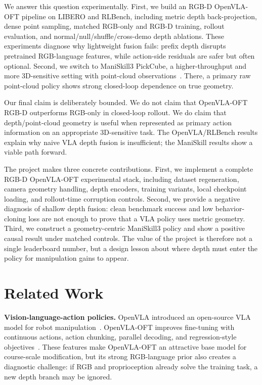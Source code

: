 \documentclass[conference]{IEEEtran}
\begin{document}
We answer this question experimentally. First, we build an RGB-D OpenVLA-OFT pipeline on LIBERO and RLBench, including metric depth back-projection, dense point sampling, matched RGB-only and RGB-D training, rollout evaluation, and normal/null/shuffle/cross-demo depth ablations. These experiments diagnose why lightweight fusion fails: prefix depth disrupts pretrained RGB-language features, while action-side residuals are safer but often optional. Second, we switch to ManiSkill3 PickCube, a higher-throughput and more 3D-sensitive setting with point-cloud observations~\citep{tao2024maniskill3}. There, a primary raw point-cloud policy shows strong closed-loop dependence on true geometry.

Our final claim is deliberately bounded. We do not claim that OpenVLA-OFT RGB-D outperforms RGB-only in closed-loop rollout. We do claim that depth/point-cloud geometry is useful when represented as primary action information on an appropriate 3D-sensitive task. The OpenVLA/RLBench results explain why naive VLA depth fusion is insufficient; the ManiSkill results show a viable path forward.

The project makes three concrete contributions. First, we implement a complete RGB-D OpenVLA-OFT experimental stack, including dataset regeneration, camera geometry handling, depth encoders, training variants, local checkpoint loading, and rollout-time corruption controls. Second, we provide a negative diagnosis of shallow depth fusion: clean benchmark success and low behavior-cloning loss are not enough to prove that a VLA policy uses metric geometry. Third, we construct a geometry-centric ManiSkill3 policy and show a positive causal result under matched controls. The value of the project is therefore not a single leaderboard number, but a design lesson about where depth must enter the policy for manipulation gains to appear.

\section{Related Work}

\textbf{Vision-language-action policies.}
OpenVLA introduced an open-source VLA model for robot manipulation~\citep{kim2024openvla}. OpenVLA-OFT improves fine-tuning with continuous actions, action chunking, parallel decoding, and regression-style objectives~\citep{kim2025oft}. These features make OpenVLA-OFT an attractive base model for course-scale modification, but its strong RGB-language prior also creates a diagnostic challenge: if RGB and proprioception already solve the training task, a new depth branch may be ignored.
\end{document}
